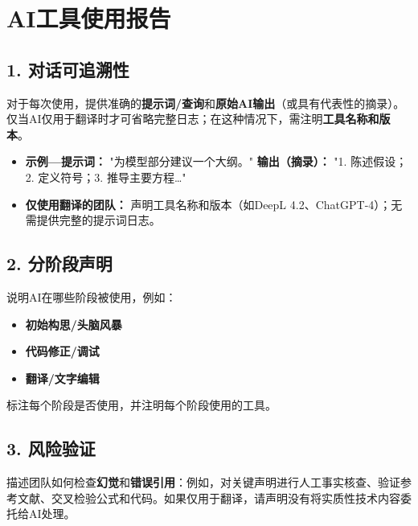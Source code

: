 \section*{AI工具使用报告}
\subsection*{1. 对话可追溯性}
对于每次使用，提供准确的\textbf{提示词/查询}和\textbf{原始AI输出}（或具有代表性的摘录）。仅当AI仅用于翻译时才可省略完整日志；在这种情况下，需注明\textbf{工具名称和版本}。

\begin{itemize}[leftmargin=*]
    \item \textbf{示例---提示词：} "为模型部分建议一个大纲。" \textbf{输出（摘录）：} "1. 陈述假设；2. 定义符号；3. 推导主要方程\ldots"
    \item \textbf{仅使用翻译的团队：} 声明工具名称和版本（如DeepL 4.2、ChatGPT-4）；无需提供完整的提示词日志。
\end{itemize}

\subsection*{2. 分阶段声明}
说明AI在哪些阶段被使用，例如：
\begin{itemize}[leftmargin=*]
    \item \textbf{初始构思/头脑风暴}
    \item \textbf{代码修正/调试}
    \item \textbf{翻译/文字编辑}
\end{itemize}
标注每个阶段是否使用，并注明每个阶段使用的工具。

\subsection*{3. 风险验证}
描述团队如何检查\textbf{幻觉}和\textbf{错误引用}：例如，对关键声明进行人工事实核查、验证参考文献、交叉检验公式和代码。如果仅用于翻译，请声明没有将实质性技术内容委托给AI处理。
